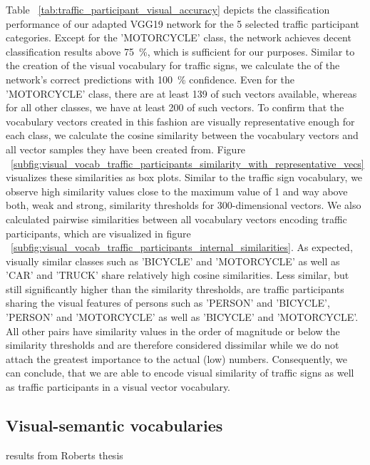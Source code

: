 Table ~\ref{tab:traffic_participant_visual_accuracy} depicts the classification performance of our adapted VGG19 network for the \num{5} selected traffic participant categories.
Except for the 'MOTORCYCLE' class, the network achieves decent classification results above \SI{75}{\percent}, which is sufficient for our purposes.
Similar to the creation of the visual vocabulary for traffic signs, we calculate the of the network's correct predictions with \SI{100}{\percent} confidence.
Even for the 'MOTORCYCLE' class, there are at least \num{139} of such vectors available, whereas for all other classes, we have at least \num{200} of such vectors.
To confirm that the vocabulary vectors created in this fashion are visually representative enough for each class, we calculate the cosine similarity between the vocabulary vectors and all vector samples they have been created from.
Figure ~\ref{subfig:visual_vocab_traffic_participants_similarity_with_representative_vecs} visualizes these similarities as box plots.
Similar to the traffic sign vocabulary, we observe high similarity values close to the maximum value of \num{1} and way above both, weak and strong, similarity thresholds for \num{300}-dimensional vectors.
We also calculated pairwise similarities between all vocabulary vectors encoding traffic participants, which are visualized in figure ~\ref{subfig:visual_vocab_traffic_participants_internal_similarities}.
As expected, visually similar classes such as 'BICYCLE' and 'MOTORCYCLE' as well as 'CAR' and 'TRUCK' share relatively high cosine similarities.
Less similar, but still significantly higher than the similarity thresholds, are traffic participants sharing the visual features of persons such as 'PERSON' and 'BICYCLE', 'PERSON' and 'MOTORCYCLE' as well as 'BICYCLE' and 'MOTORCYCLE'.
All other pairs have similarity values in the order of magnitude or below the similarity thresholds and are therefore considered dissimilar while we do not attach the greatest importance to the actual (low) numbers.
Consequently, we can conclude, that we are able to encode visual similarity of traffic signs as well as traffic participants in a visual vector vocabulary.



\subsection{Visual-semantic vocabularies}%
\label{subsec:visual_semantic_vocabularies}

results from Roberts thesis

